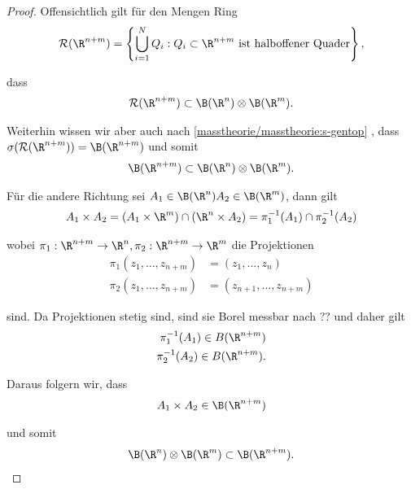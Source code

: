 \documentclass[letterpaper,10pt,german]{jupyterBook}
\begin{document}
\begin{proof}
 Offensichtlich gilt für den Mengen Ring
\begin{align*}
\mathcal{R}(\R^{n+m})=\left\{\bigcup_{i=1}^N Q_i: Q_i\subset\R^{n+m}\text{ ist halboffener Quader} \right\},
\end{align*}
\par
dass
\begin{align*}
\mathcal{R}(\R^{n+m})\subset \B(\R^n)\otimes \B(\R^m).
\end{align*}
\par
Weiterhin wissen wir aber auch nach \cref{masstheorie/masstheorie:s-gentop} , dass \(\sigma(\mathcal{R}(\R^{n+m})) = \B(\R^{n+m})\) und somit
\begin{align*}
\B(\R^{n+m})\subset \B(\R^n)\otimes \B(\R^m).
\end{align*}
\par
Für die andere Richtung sei \(A_1\in\B(\R^n) A_2\in\B(\R^m)\), dann gilt
\begin{align*}
A_1\times A_2 = \left(A_1\times\R^m\right) \cap (\R^n\times A_2) =\pi_1^{-1}(A_1) \cap \pi_2^{-1}(A_2)
\end{align*}
\par
wobei \(\pi_1:\R^{n+m}\to\R^n,\pi_2:\R^{n+m}\to\R^m\) die Projektionen
\begin{align*}
\pi_1(z_1,\ldots,z_{n+m})&= (z_1,\ldots, z_n)\\
\pi_2(z_1,\ldots,z_{n+m})&= (z_{n+1},\ldots, z_{n+m})
\end{align*}
\par
sind. Da Projektionen stetig sind, sind sie Borel messbar nach ?? und daher gilt
\begin{align*}
\pi_1^{-1}(A_1)\in B(\R^{n+m})\\
\pi_2^{-1}(A_2)\in B(\R^{n+m}).
\end{align*}
\par
Daraus folgern wir, dass
\begin{align*}
A_1\times A_2 \in \B(\R^{n+m})
\end{align*}
\par
und somit
\begin{align*}
\B(\R^n)\otimes \B(\R^m)\subset\B(\R^{n+m}).
\end{align*}\end{proof}
\end{document}
